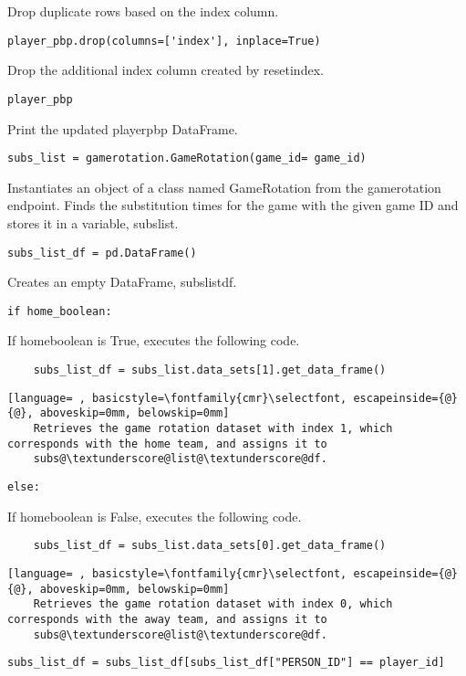 \documentclass{article}
\begin{document}
Drop duplicate rows based on the index column.
\begin{lstlisting}
player_pbp.drop(columns=['index'], inplace=True)
\end{lstlisting}
Drop the additional index column created by reset\textunderscore index.
\begin{lstlisting}
player_pbp
\end{lstlisting}
Print the updated player\textunderscore pbp DataFrame.
\begin{lstlisting}
subs_list = gamerotation.GameRotation(game_id= game_id)
\end{lstlisting}
Instantiates an object of a class named GameRotation from the gamerotation endpoint. Finds the substitution times for the game with the given game ID and stores it in a variable, subs\textunderscore list.
\begin{lstlisting}
subs_list_df = pd.DataFrame()
\end{lstlisting}
Creates an empty DataFrame, subs\textunderscore list\textunderscore df.
\begin{lstlisting}
if home_boolean:
\end{lstlisting}
If home\textunderscore boolean is True, executes the following code.
\begin{lstlisting}
    subs_list_df = subs_list.data_sets[1].get_data_frame()
\end{lstlisting}
\begin{lstlisting}[language= , basicstyle=\fontfamily{cmr}\selectfont, escapeinside={@}{@}, aboveskip=0mm, belowskip=0mm]
    Retrieves the game rotation dataset with index 1, which corresponds with the home team, and assigns it to
    subs@\textunderscore@list@\textunderscore@df.
\end{lstlisting}
\begin{lstlisting}
else:
\end{lstlisting}
If home\textunderscore boolean is False, executes the following code.
\begin{lstlisting}
    subs_list_df = subs_list.data_sets[0].get_data_frame()
\end{lstlisting}
\begin{lstlisting}[language= , basicstyle=\fontfamily{cmr}\selectfont, escapeinside={@}{@}, aboveskip=0mm, belowskip=0mm]
    Retrieves the game rotation dataset with index 0, which corresponds with the away team, and assigns it to
    subs@\textunderscore@list@\textunderscore@df.
\end{lstlisting}
\begin{lstlisting}
subs_list_df = subs_list_df[subs_list_df["PERSON_ID"] == player_id]
\end{lstlisting}
\end{document}
